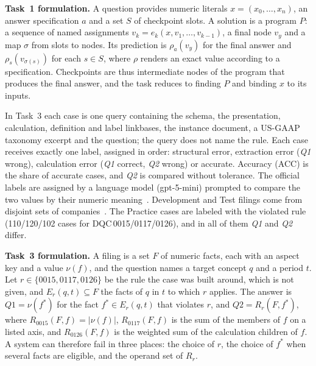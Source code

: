 \documentclass[conference]{IEEEtran}
\newcommand{\DQC}[1]{DQC\,#1}
\newcommand{\QA}{\textit{Q1}}
\newcommand{\QB}{\textit{Q2}}
\begin{document}
\textbf{Task~1 formulation.} A question provides numeric literals $x=(x_0,\dots,x_n)$, an answer specification $a$ and a set $S$ of checkpoint slots. A solution is a program $P$: a sequence of named assignments $v_k=e_k(x,v_1,\dots,v_{k-1})$, a final node $v_y$ and a map $\sigma$ from slots to nodes. Its prediction is $\rho_a(v_y)$ for the final answer and $\rho_s(v_{\sigma(s)})$ for each $s\in S$, where $\rho$ renders an exact value according to a specification. Checkpoints are thus intermediate nodes of the program that produces the final answer, and the task reduces to finding $P$ and binding $x$ to its inputs.

In Task~3 each case is one query containing the schema, the presentation, calculation, definition and label linkbases, the instance document, a US-GAAP taxonomy excerpt and the question; the query does not name the rule. Each case receives exactly one label, assigned in order: structural error, extraction error (\QA{} wrong), calculation error (\QA{} correct, \QB{} wrong) or accurate. Accuracy (ACC) is the share of accurate cases, and \QB{} is compared without tolerance. The official labels are assigned by a language model (gpt-5-mini) prompted to compare the two values by their numeric meaning~\cite{task3results}. Development and Test filings come from disjoint sets of companies~\cite{task3data}. The Practice cases are labeled with the violated rule (110/120/102 cases for \DQC{0015/0117/0126}), and in all of them \QA{} and \QB{} differ.

\textbf{Task~3 formulation.} A filing is a set $F$ of numeric facts, each with an aspect key and a value $\nu(f)$, and the question names a target concept $q$ and a period $t$. Let $r\in\{0015,0117,0126\}$ be the rule the case was built around, which is not given, and $E_r(q,t)\subseteq F$ the facts of $q$ in $t$ to which $r$ applies. The answer is $\QA{}=\nu(f^*)$ for the fact $f^*\in E_r(q,t)$ that violates $r$, and $\QB{}=R_r(F,f^*)$, where $R_{0015}(F,f)=|\nu(f)|$, $R_{0117}(F,f)$ is the sum of the members of $f$ on a listed axis, and $R_{0126}(F,f)$ is the weighted sum of the calculation children of $f$. A system can therefore fail in three places: the choice of $r$, the choice of $f^*$ when several facts are eligible, and the operand set of $R_r$.
\end{document}
